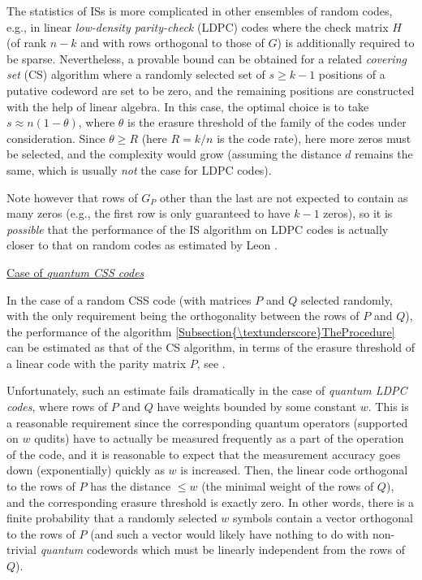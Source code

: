 \documentclass[a4paper,11pt]{report}
\begin{document}
{{{ The statistics of ISs is more complicated in other ensembles of random codes,
e.g., in linear \emph{low-density parity-check} (LDPC) codes where the check matrix $H$ (of rank $n-k$ and with rows orthogonal to those of $G$) is additionally required to be sparse. Nevertheless, a provable bound can be
obtained for a related \emph{covering set} (CS) algorithm where a randomly selected set of $s\ge k-1$ positions of a putative codeword are set to be zero, and the remaining
positions are constructed with the help of linear algebra. In this case, the
optimal choice \cite{Dumer-Kovalev-Pryadko-IEEE-2017} is to take $s\approx n(1-\theta)$, where $\theta $ is the erasure threshold of the family of the codes under consideration. Since $\theta\ge R$ (here $R=k/n$ is the code rate), here more zeros must be selected, and the complexity would
grow (assuming the distance $d$ remains the same, which is usually \emph{not} the case for LDPC codes). 

 Note however that rows of $G_P$ other than the last are not expected to contain as many zeros (e.g., the first
row is only guaranteed to have $k-1$ zeros), so it is \emph{possible} that the performance of the IS algorithm on LDPC codes is actually closer to
that on random codes as estimated by Leon \cite{Leon-1988}. 

 
\medskip\noindent\underline{%
 Case of \emph{quantum CSS codes} 
}
 

 In the case of a random CSS code (with matrices $P$ and $Q$ selected randomly, with the only requirement being the orthogonality between
the rows of $P$ and $Q$), the performance of the algorithm \ref{Subsection{\textunderscore}TheProcedure} can be estimated as that of the CS algorithm, in terms of the erasure
threshold of a linear code with the parity matrix $P$, see \cite{Dumer-Kovalev-Pryadko-IEEE-2017}. 

 Unfortunately, such an estimate fails dramatically in the case of \emph{quantum LDPC codes}, where rows of $P$ and $Q$ have weights bounded by some constant $w$. This is a reasonable requirement since the corresponding quantum operators
(supported on $w$ qudits) have to actually be measured frequently as a part of the operation of
the code, and it is reasonable to expect that the measurement accuracy goes
down (exponentially) quickly as $w$ is increased. Then, the linear code orthogonal to the rows of $P$ has the distance $\le w$ (the minimal weight of the rows of $Q$), and the corresponding erasure threshold is exactly zero. In other words,
there is a finite probability that a randomly selected $w$ symbols contain a vector orthogonal to the rows of $P$ (and such a vector would likely have nothing to do with non-trivial \emph{quantum} codewords which must be linearly independent from the rows of $Q$). 

}}}
\end{document}
